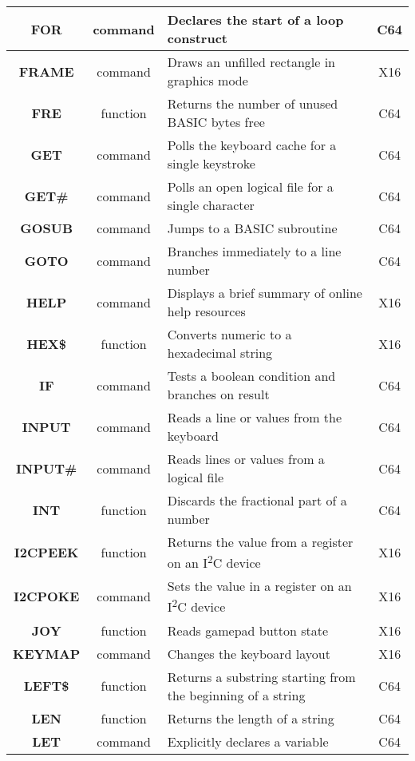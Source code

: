 \begin{longtable}{|c|c|m{4cm}|c|}
	{\bfseries FOR} & command & Declares the start of a loop construct & C64 \\ \hline
	{\bfseries FRAME} & command & Draws an unfilled rectangle in graphics mode & X16 \\ \hline
	{\bfseries FRE} & function & Returns the number of unused BASIC bytes free & C64 \\ \hline
	{\bfseries GET} & command & Polls the keyboard cache for a single keystroke & C64 \\ \hline
	{\bfseries GET\#} & command & Polls an open logical file for a single character & C64 \\ \hline
	{\bfseries GOSUB} & command & Jumps to a BASIC subroutine & C64 \\ \hline
	{\bfseries GOTO} & command & Branches immediately to a line number & C64 \\ \hline
	{\bfseries HELP} & command & Displays a brief summary of online help resources & X16 \\ \hline
	{\bfseries HEX\$} & function & Converts numeric to a hexadecimal string & X16 \\ \hline
	{\bfseries IF} & command & Tests a boolean condition and branches on result & C64 \\ \hline
	{\bfseries INPUT} & command & Reads a line or values from the keyboard & C64 \\ \hline
	{\bfseries INPUT\#} & command & Reads lines or values from a logical file & C64 \\ \hline
	{\bfseries INT} & function & Discards the fractional part of a number & C64 \\ \hline
	{\bfseries I2CPEEK} & function & Returns the value from a register on an I\textsuperscript{2}C device & X16 \\ \hline
	{\bfseries I2CPOKE} & command & Sets the value in a register on an I\textsuperscript{2}C device & X16 \\ \hline
	{\bfseries JOY} & function & Reads gamepad button state & X16 \\ \hline
	{\bfseries KEYMAP} & command & Changes the keyboard layout & X16 \\ \hline
	{\bfseries LEFT\$} & function & Returns a substring starting from the beginning of a string & C64 \\ \hline
	{\bfseries LEN} & function & Returns the length of a string & C64 \\ \hline
	{\bfseries LET} & command & Explicitly declares a variable & C64 \\ \hline

\end{longtable}
